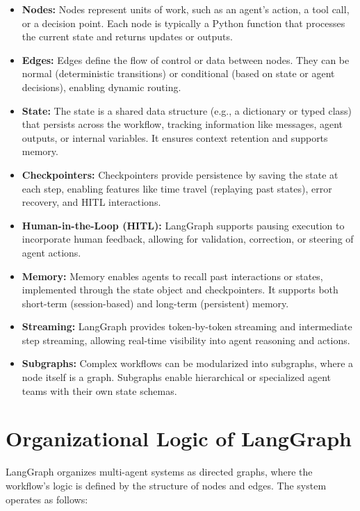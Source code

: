 \documentclass{article}
\begin{document}
\begin{itemize}
    \item \textbf{Nodes:} Nodes represent units of work, such as an agent’s action, a tool call, or a decision point. Each node is typically a Python function that processes the current state and returns updates or outputs.
    \item \textbf{Edges:} Edges define the flow of control or data between nodes. They can be normal (deterministic transitions) or conditional (based on state or agent decisions), enabling dynamic routing.
    \item \textbf{State:} The state is a shared data structure (e.g., a dictionary or typed class) that persists across the workflow, tracking information like messages, agent outputs, or internal variables. It ensures context retention and supports memory.
    \item \textbf{Checkpointers:} Checkpointers provide persistence by saving the state at each step, enabling features like time travel (replaying past states), error recovery, and HITL interactions.
    \item \textbf{Human-in-the-Loop (HITL):} LangGraph supports pausing execution to incorporate human feedback, allowing for validation, correction, or steering of agent actions.
    \item \textbf{Memory:} Memory enables agents to recall past interactions or states, implemented through the state object and checkpointers. It supports both short-term (session-based) and long-term (persistent) memory.
    \item \textbf{Streaming:} LangGraph provides token-by-token streaming and intermediate step streaming, allowing real-time visibility into agent reasoning and actions.
    \item \textbf{Subgraphs:} Complex workflows can be modularized into subgraphs, where a node itself is a graph. Subgraphs enable hierarchical or specialized agent teams with their own state schemas.
\end{itemize}

\section{Organizational Logic of LangGraph}

LangGraph organizes multi-agent systems as directed graphs, where the workflow’s logic is defined by the structure of nodes and edges. The system operates as follows:
\end{document}
